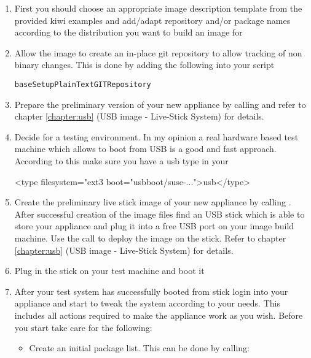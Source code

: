 \begin{enumerate}
\item First you should choose an appropriate image description template from
      the provided kiwi examples and add/adapt repository and/or
      package names according to the distribution you want to
      build an image for
\item Allow the image to create an in-place git repository to
      allow tracking of non binary changes. This is done by adding
      the following into your  script
 
\begin{verbatim}
baseSetupPlainTextGITRepository
\end{verbatim}

\item Prepare the preliminary version of your new appliance by
      calling  and refer to chapter \ref{chapter:usb}
      (USB image - Live-Stick System) for details.
\item Decide for a testing environment. In my opinion a real
      hardware based test machine which allows to boot from USB
      is a good and fast approach. According to this make sure
      you have a usb type in your 

\begin{xml}
<type filesystem="ext3 boot="usbboot/suse-...">usb</type>
\end{xml}

\item Create the preliminary live stick image of your new appliance
      by calling . After successful creation
      of the image files find an USB stick which is able to store
      your appliance and plug it into a free USB port on your image
      build machine. Use the  call to deploy
      the image on the stick. Refer to chapter \ref{chapter:usb}
      (USB image - Live-Stick System) for details.
\item Plug in the stick on your test machine and boot it
\item After your test system has successfully booted from stick login
      into your appliance and start to tweak the system according to
      your needs. This includes all actions required to make the
      appliance work as you wish. Before you start take care for
      the following:
      \begin{itemize}
      \item Create an initial package list. This can be done by calling:


\end{itemize}
\end{enumerate}

